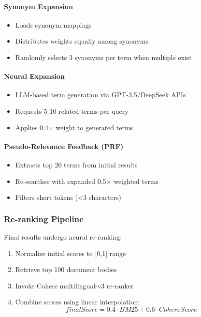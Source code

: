 \paragraph{Synonym Expansion}
\begin{itemize}
    \item Loads synonym mappings
    \item Distributes weights equally among synonyms
    \item Randomly selects 3 synonyms per term when multiple exist
\end{itemize}

\paragraph{Neural Expansion}
\begin{itemize}
    \item LLM-based term generation via GPT-3.5/DeepSeek APIs
    \item Requests 5-10 related terms per query
    \item Applies 0.4$\times$ weight to generated terms
\end{itemize}

\paragraph{Pseudo-Relevance Feedback (PRF)}
\begin{itemize}
    \item Extracts top 20 terms from initial results
    \item Re-searches with expanded 0.5$\times$ weighted terms
    \item Filters short tokens (<3 characters)
\end{itemize}

\subsubsection{Re-ranking Pipeline}
\label{subsubsec:Re-ranking Pipeline}
Final results undergo neural re-ranking:

\begin{enumerate}
    \item Normalize initial scores to [0,1] range
    \item Retrieve top 100 document bodies
    \item Invoke Cohere multilingual-v3 re-ranker
    \item Combine scores using linear interpolation:
    \[
    \mathit{finalScore} = 0.4 \cdot \mathit{BM25} + 0.6 \cdot \mathit{CohereScore}
    \]
\end{enumerate}

